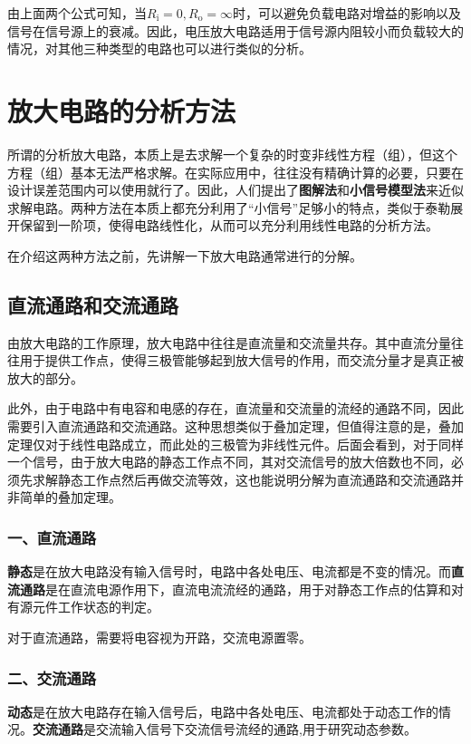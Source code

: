 由上面两个公式可知，当$R_\mathrm{i}=0,R_\mathrm{o}=\infty$时，可以避免负载电路对增益的影响以及信号在信号源上的衰减。因此，电压放大电路适用于信号源内阻较小而负载较大的情况，对其他三种类型的电路也可以进行类似的分析。

\section{放大电路的分析方法}
所谓的分析放大电路，本质上是去求解一个复杂的时变非线性方程（组），但这个方程（组）基本无法严格求解。在实际应用中，往往没有精确计算的必要，只要在设计误差范围内可以使用就行了。因此，人们提出了\textbf{图解法}和\textbf{小信号模型法}来近似求解电路。两种方法在本质上都充分利用了“小信号”足够小的特点，类似于泰勒展开保留到一阶项，使得电路线性化，从而可以充分利用线性电路的分析方法。

在介绍这两种方法之前，先讲解一下放大电路通常进行的分解。

\subsection{直流通路和交流通路}
由放大电路的工作原理，放大电路中往往是直流量和交流量共存。其中直流分量往往用于提供工作点，使得三极管能够起到放大信号的作用，而交流分量才是真正被放大的部分。

此外，由于电路中有电容和电感的存在，直流量和交流量的流经的通路不同，因此需要引入直流通路和交流通路。这种思想类似于叠加定理，但值得注意的是，叠加定理仅对于线性电路成立，而此处的三极管为非线性元件。后面会看到，对于同样一个信号，由于放大电路的静态工作点不同，其对交流信号的放大倍数也不同，必须先求解静态工作点然后再做交流等效，这也能说明分解为直流通路和交流通路并非简单的叠加定理。

\subsubsection{一、直流通路}
\textbf{静态}是在放大电路没有输入信号时，电路中各处电压、电流都是不变的情况。而\textbf{直流通路}是在直流电源作用下，直流电流流经的通路，用于对静态工作点的估算和对有源元件工作状态的判定。

对于直流通路，需要将电容视为开路，交流电源置零。

\subsubsection{二、交流通路}
\textbf{动态}是在放大电路存在输入信号后，电路中各处电压、电流都处于动态工作的情况。\textbf{交流通路}是交流输入信号下交流信号流经的通路,用于研究动态参数。

